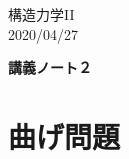 \documentclass[10pt,a4j]{jarticle}
\newlength{\minitwocolumn}
\begin{document}
\newcommand{\fat}[1]{\mbox{\boldmath $#1$}}
\newcommand{\D}{\partial}
\newcommand{\w}{\omega}
\newcommand{\ga}{\alpha}
\newcommand{\gb}{\beta}
\newcommand{\gx}{\xi}
\newcommand{\gz}{\zeta}
\newcommand{\vhat}[1]{\hat{\fat{#1}}}
\newcommand{\spc}{\vspace{0.7\baselineskip}}
\newcommand{\halfspc}{\vspace{0.3\baselineskip}}

\newcommand{\twofig}[2]
 {
   \begin{figure}
     \begin{minipage}[t]{\minitwocolumn}
         \begin{center}   #1
         \end{center}
     \end{minipage}
         \hspace{\columnsep}
     \begin{minipage}[t]{\minitwocolumn}
         \begin{center} #2
         \end{center}
     \end{minipage}
   \end{figure}
 }
\begin{flushright}
	構造力学II\\
	2020/04/27
\end{flushright}
\begin{center}
	{\Large \bf 講義ノート２} \\
\end{center}
\setcounter{section}{1}
\section{曲げ問題}
\end{document}
